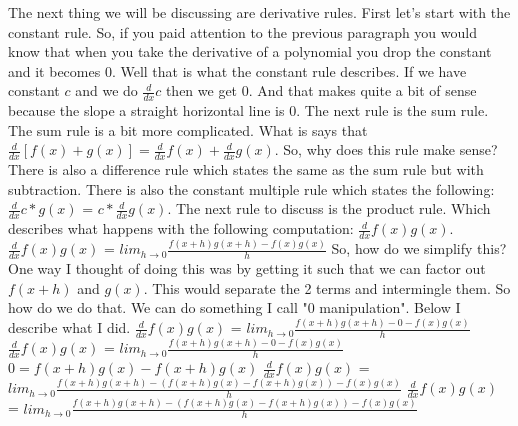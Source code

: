 \documentclass{article}
\begin{document}
The next thing we will be discussing are derivative rules. First let's start with the constant rule. So, if you paid attention to the previous paragraph you would know that when you take the derivative of a polynomial you drop the constant and it becomes 0. Well that is what the constant rule describes. If we have constant $c$ and we do $\frac{d}{dx} c$ then we get $0$. And that makes quite a bit of sense because the slope a straight horizontal line is 0. The next rule is the sum rule. The sum rule is a bit more complicated. What is says that $\frac{d}{dx} [f(x)+g(x)] = \frac{d}{dx} f(x) + \frac{d}{dx} g(x)$. So, why does this rule make sense? There is also a difference rule which states the same as the sum rule but with subtraction. There is also the constant multiple rule which states the following: $\frac{d}{dx} c*g(x)$ = $c*\frac{d}{dx} g(x)$. 
\newline
\newline
The next rule to discuss is the product rule. Which describes what happens with the following computation: $\frac{d}{dx} f(x) g(x)$.
\newline
\newline
$\frac{d}{dx} f(x) g(x)$ = $lim_{h\to 0} \frac{f(x+h)g(x+h) - f(x)g(x)}{h}$
\newline
\newline
So, how do we simplify this? One way I thought of doing this was by getting it such that we can factor out $f(x+h)$ and $g(x)$. This would separate the 2 terms and intermingle them. So how do we do that. We can do something I call "$0$ manipulation". Below I describe what I did.
\newline
\newline
$\frac{d}{dx} f(x) g(x)$ = $lim_{h\to 0} \frac{f(x+h)g(x+h) - 0 - f(x)g(x)}{h}$
\newline
\newline
$\frac{d}{dx} f(x) g(x)$ = $lim_{h\to 0} \frac{f(x+h)g(x+h) - 0 - f(x)g(x)}{h}$
\newline
\newline
$0 = f(x+h)g(x)-f(x+h)g(x)$
\newline
\newline
$\frac{d}{dx} f(x) g(x)$ = $lim_{h\to 0} \frac{f(x+h)g(x+h) - (f(x+h)g(x)-f(x+h)g(x)) - f(x)g(x)}{h}$
\newline
\newline
$\frac{d}{dx} f(x) g(x)$ = $lim_{h\to 0} \frac{f(x+h)g(x+h) - (f(x+h)g(x)-f(x+h)g(x)) - f(x)g(x)}{h}$
\newline
\newline
\end{document}
